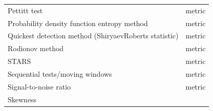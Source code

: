 \documentclass[12pt,twoside,openany]{reedthesis}
\begin{document}
\begin{longtable}[]{@{}lc@{}}
\begin{minipage}[t]{0.31\columnwidth}\raggedright
Pettitt test\strut
\end{minipage} & \begin{minipage}[t]{0.35\columnwidth}\centering
metric\strut
\end{minipage}\tabularnewline
\begin{minipage}[t]{0.31\columnwidth}\raggedright
Probability
density function
entropy method\strut
\end{minipage} & \begin{minipage}[t]{0.35\columnwidth}\centering
metric\strut
\end{minipage}\tabularnewline
\begin{minipage}[t]{0.31\columnwidth}\raggedright
Quickest
detection method
(ShiryaevRoberts
statistic)\strut
\end{minipage} & \begin{minipage}[t]{0.35\columnwidth}\centering
metric\strut
\end{minipage}\tabularnewline
\begin{minipage}[t]{0.31\columnwidth}\raggedright
Rodionov method\strut
\end{minipage} & \begin{minipage}[t]{0.35\columnwidth}\centering
metric\strut
\end{minipage}\tabularnewline
\begin{minipage}[t]{0.31\columnwidth}\raggedright
STARS\strut
\end{minipage} & \begin{minipage}[t]{0.35\columnwidth}\centering
metric\strut
\end{minipage}\tabularnewline
\begin{minipage}[t]{0.31\columnwidth}\raggedright
Sequential
tests/moving
windows\strut
\end{minipage} & \begin{minipage}[t]{0.35\columnwidth}\centering
metric\strut
\end{minipage}\tabularnewline
\begin{minipage}[t]{0.31\columnwidth}\raggedright
Signal-to-noise
ratio\strut
\end{minipage} & \begin{minipage}[t]{0.35\columnwidth}\centering
metric\strut
\end{minipage}\tabularnewline
\begin{minipage}[t]{0.31\columnwidth}\raggedright
Skewness\strut
\end{minipage} & \begin{minipage}[t]{0.35\columnwidth}\centering

\end{minipage}
\end{longtable}
\end{document}
